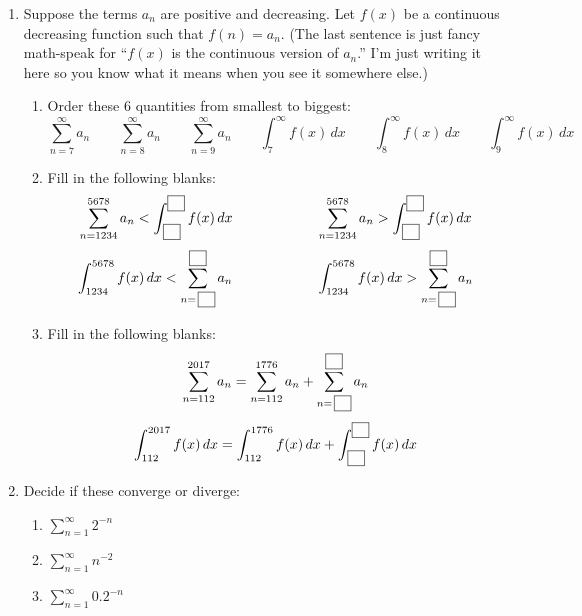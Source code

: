 \documentclass[11pt]{article}
\begin{document}
\begin{enumerate}

  \item Suppose the terms $a_n$ are positive and decreasing. Let $f(x)$ be a
  continuous decreasing function such that $f(n) = a_n$. (The last sentence is
  just fancy math-speak for ``$f(x)$ is the continuous version of $a_n$.'' I'm
  just writing it here so you know what it means when you see it somewhere
  else.) \begin{enumerate}

    \item Order these 6 quantities from smallest to biggest: \[
      \sum_{n=7}^\infty a_n
      \qquad
      \sum_{n=8}^\infty a_n
      \qquad
      \sum_{n=9}^\infty a_n
      \qquad
      \int_7^\infty f(x) \, dx
      \qquad
      \int_8^\infty f(x) \, dx
      \qquad
      \int_9^\infty f(x) \, dx
    \]

    \item Fill in the following blanks: \[
      \sum_{n=1234}^{5678} a_n <
      \int_{\,\fbox{\phantom{n}}}^{\fbox{\phantom{n}}} f(x) \, dx
      \qquad\qquad\qquad
      \sum_{n=1234}^{5678} a_n >
      \int_{\,\fbox{\phantom{n}}}^{\fbox{\phantom{n}}} f(x) \, dx
    \] \[
      \int_{1234}^{5678} f(x) \, dx <
      \sum_{n=\,\fbox{\phantom{n}}}^{\fbox{\phantom{n}}} a_n
      \qquad\qquad\qquad
      \int_{1234}^{5678} f(x) \, dx >
      \sum_{n=\,\fbox{\phantom{n}}}^{\fbox{\phantom{n}}} a_n
    \]

    \item Fill in the following blanks: \[
      \sum_{n=112}^{2017} a_n =
      \sum_{n=112}^{1776} a_n +
      \sum_{n=\,\fbox{\phantom{n}}}^{\fbox{\phantom{n}}} a_n
    \] \[
      \int_{112}^{2017} f(x) \, dx =
      \int_{112}^{1776} f(x) \, dx +
      \int_{\,\fbox{\phantom{n}}}^{\fbox{\phantom{n}}} f(x) \, dx
    \]

  \end{enumerate}

  \item Decide if these converge or diverge: \begin{enumerate}

    \item $\displaystyle \sum_{n=1}^\infty 2^{-n}$

    \item $\displaystyle \sum_{n=1}^\infty n^{-2}$

    \item $\displaystyle \sum_{n=1}^\infty 0.2^{-n}$


\end{enumerate}
\end{enumerate}
\end{document}
